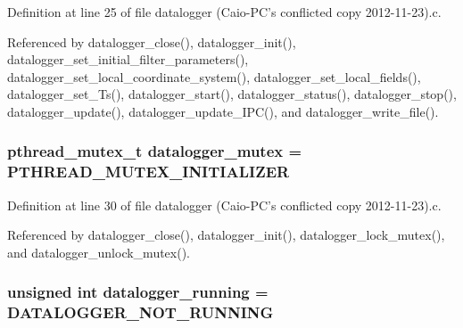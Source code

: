 Definition at line 25 of file datalogger (\-Caio-\/\-P\-C's conflicted copy 2012-\/11-\/23).\-c.



Referenced by datalogger\-\_\-close(), datalogger\-\_\-init(), datalogger\-\_\-set\-\_\-initial\-\_\-filter\-\_\-parameters(), datalogger\-\_\-set\-\_\-local\-\_\-coordinate\-\_\-system(), datalogger\-\_\-set\-\_\-local\-\_\-fields(), datalogger\-\_\-set\-\_\-\-Ts(), datalogger\-\_\-start(), datalogger\-\_\-status(), datalogger\-\_\-stop(), datalogger\-\_\-update(), datalogger\-\_\-update\-\_\-\-I\-P\-C(), and datalogger\-\_\-write\-\_\-file().

\hypertarget{datalogger_01_07Caio-PC's_01conflicted_01copy_012012-11-23_08_8c_a824d6f7fd1d3898ba0b1100ba37875c6}{
\subsubsection[{datalogger\-\_\-mutex}]{\setlength{\rightskip}{0pt plus 5cm}pthread\-\_\-mutex\-\_\-t datalogger\-\_\-mutex = P\-T\-H\-R\-E\-A\-D\-\_\-\-M\-U\-T\-E\-X\-\_\-\-I\-N\-I\-T\-I\-A\-L\-I\-Z\-E\-R}}\label{datalogger_01_07Caio-PC's_01conflicted_01copy_012012-11-23_08_8c_a824d6f7fd1d3898ba0b1100ba37875c6}


Definition at line 30 of file datalogger (\-Caio-\/\-P\-C's conflicted copy 2012-\/11-\/23).\-c.



Referenced by datalogger\-\_\-close(), datalogger\-\_\-init(), datalogger\-\_\-lock\-\_\-mutex(), and datalogger\-\_\-unlock\-\_\-mutex().

\hypertarget{datalogger_01_07Caio-PC's_01conflicted_01copy_012012-11-23_08_8c_a185c3ede96449d14f330fe5ac664e799}{
\subsubsection[{datalogger\-\_\-running}]{\setlength{\rightskip}{0pt plus 5cm}unsigned int datalogger\-\_\-running = {\bf D\-A\-T\-A\-L\-O\-G\-G\-E\-R\-\_\-\-N\-O\-T\-\_\-\-R\-U\-N\-N\-I\-N\-G}}}\label{datalogger_01_07Caio-PC's_01conflicted_01copy_012012-11-23_08_8c_a185c3ede96449d14f330fe5ac664e799}


